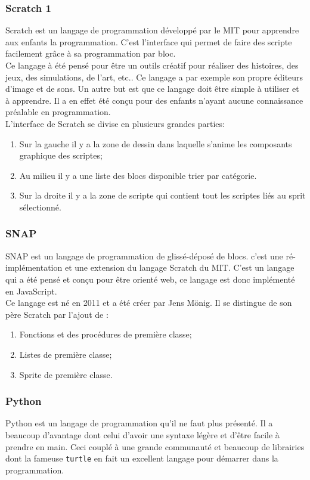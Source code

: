\subsubsection{Scratch 1}
Scratch est un langage de programmation développé par le MIT pour apprendre aux enfants la programmation. C'est l'interface qui permet de faire des scripte facilement grâce à sa programmation par bloc.\\

Ce langage à été pensé pour être un outils créatif pour réaliser des histoires, des jeux, des simulations, de l'art, etc.. Ce langage a par exemple son propre éditeurs d'image et de sons. Un autre but est que ce langage doit être simple à utiliser et à apprendre. Il a en effet été conçu pour des enfants n'ayant aucune connaissance préalable en programmation.\\

L'interface de Scratch se divise en plusieurs grandes parties:
\begin{enumerate}
\item Sur la gauche il y a la zone de dessin dans laquelle s'anime les composants graphique des scriptes;
\item Au milieu il y a une liste des blocs disponible trier par catégorie.
\item Sur la droite il y a la zone de scripte qui contient tout les scriptes liés au sprit sélectionné.
\end{enumerate}

\subsubsection{SNAP}
SNAP est un langage de programmation de glissé-déposé de blocs. c'est une ré-implémentation et une extension du langage Scratch du MIT. C'est un langage qui a été pensé et conçu pour être orienté web, ce langage est donc implémenté en JavaScript.\\

Ce langage est né en 2011 et a été créer par Jens Mönig. Il se distingue de son père Scratch par l'ajout de :
\begin{enumerate}
\item Fonctions et des procédures de première classe;
\item Listes de première classe;
\item Sprite de première classe.
\end{enumerate}

\subsubsection{Python}
Python est un langage de programmation qu'il ne faut plus présenté. Il a beaucoup d'avantage dont celui d'avoir une syntaxe légère et d'être facile à prendre en main. Ceci couplé à une grande communauté et beaucoup de librairies dont la fameuse \texttt{turtle} en fait un excellent langage pour démarrer dans la programmation.

